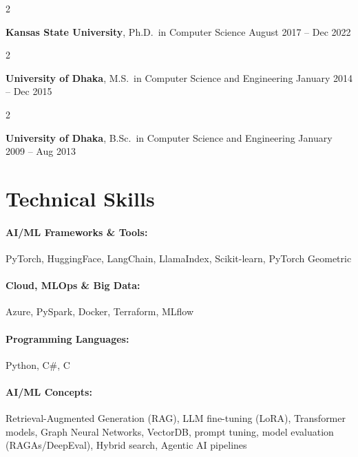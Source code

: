 \documentclass[10pt, letterpaper]{article}
\newenvironment{twocolentry}[2][]{
    \onecolentry
    \def\secondColumn{#2}
    \setcolumnwidth{\fill, 4.5 cm}
    \begin{paracol}{2}
}{
    \switchcolumn \raggedleft \secondColumn
    \end{paracol}
    \endonecolentry
} %
\begin{document}
        \begin{twocolentry}{
            August 2017 -- Dec 2022
        }
            \textbf{Kansas State University}, Ph.D.\ in Computer Science\end{twocolentry}

        \begin{twocolentry}{
            January 2014 -- Dec 2015
        }
            \textbf{University of Dhaka}, M.S.\ in Computer Science and Engineering\end{twocolentry}

        \begin{twocolentry}{
            January 2009 -- Aug 2013
        }
            \textbf{University of Dhaka}, B.Sc.\ in Computer Science and Engineering\end{twocolentry}

    \vspace{-1mm}
    \section{Technical Skills}

        \paragraph{AI/ML Frameworks \& Tools:} PyTorch, HuggingFace, LangChain, LlamaIndex, Scikit-learn, PyTorch Geometric
        \vspace{-4mm}
        \paragraph{Cloud, MLOps \& Big Data:} Azure, PySpark, Docker, Terraform, MLflow
        \vspace{-4mm}
        \paragraph{Programming Languages:} Python, C\#, C
        \vspace{-4mm}
        \paragraph{AI/ML Concepts:} Retrieval-Augmented Generation (RAG), LLM fine-tuning (LoRA), Transformer models, Graph Neural Networks, VectorDB, prompt tuning, model evaluation (RAGAs/DeepEval), Hybrid search, Agentic AI pipelines
\end{document}

